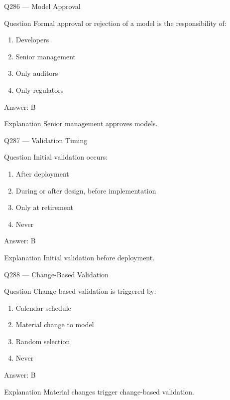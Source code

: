 \documentclass[aspectratio=169,8pt]{beamer}
\begin{document}
\begin{frame}{Q286 --- Model Approval}
\begin{block}{Question}
	Formal approval or rejection of a model is the responsibility of:
	\begin{enumerate}
		\item Developers
		\item Senior management
		\item Only auditors
		\item Only regulators
	\end{enumerate}
\end{block}
\begin{exampleblock}{Answer: B}\end{exampleblock}
\begin{block}{Explanation}
	Senior management approves models.
\end{block}
\end{frame}

\begin{frame}{Q287 --- Validation Timing}
\begin{block}{Question}
	Initial validation occurs:
	\begin{enumerate}
		\item After deployment
		\item During or after design, before implementation
		\item Only at retirement
		\item Never
	\end{enumerate}
\end{block}
\begin{exampleblock}{Answer: B}\end{exampleblock}
\begin{block}{Explanation}
	Initial validation before deployment.
\end{block}
\end{frame}

\begin{frame}{Q288 --- Change-Based Validation}
\begin{block}{Question}
	Change-based validation is triggered by:
	\begin{enumerate}
		\item Calendar schedule
		\item Material change to model
		\item Random selection
		\item Never
	\end{enumerate}
\end{block}
\begin{exampleblock}{Answer: B}\end{exampleblock}
\begin{block}{Explanation}
	Material changes trigger change-based validation.
\end{block}
\end{frame}
\end{document}
